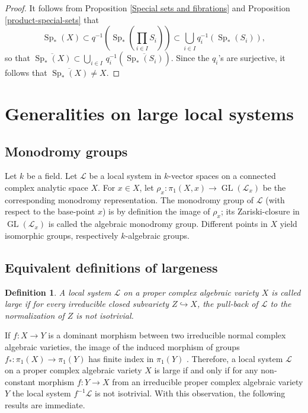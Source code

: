\documentclass[11pt,letterpaper]{amsart}
\def\cL{\mathcal{L}}
\theoremstyle{plain}
\newtheorem{defn}[thm]{Definition}
\DeclareMathOperator{\Sp}{Sp}
\DeclareMathOperator{\GL}{GL}
\begin{document}
\begin{proof}
It follows from Proposition \ref{Special sets and fibrations} and Proposition \ref{product-special-sets} that
\[ \Sp_\ast(X) \subset  q^{-1} \left( \Sp_*(\prod_{i \in I} S_i) \right) \subset \bigcup_{i \in I} q_i^{-1} \left(\Sp_*(S_i) \right),\]
so that $\overline{\Sp_\ast(X)} \subset \bigcup_{i \in I} \, q_i^{-1} (\overline{\Sp_\ast(S_i)} )$.
Since the $q_i$'s are surjective, it follows that $\overline{\Sp_\ast(X)} \neq X$.
\end{proof}



\section{Generalities on large local systems}\label{large local systems}

\subsection{Monodromy groups}

Let $k$ be a field. Let $\cL$ be a local system in $k$-vector spaces on a connected complex analytic space $X$. For $x \in X$, let $\rho_x \colon \pi_1(X, x) \to \GL(\cL_x)$ be the corresponding monodromy representation. The monodromy group of $\cL$ (with respect to the base-point $x$) is by definition the image of $\rho_x$; its Zariski-closure in $\GL(\cL_x)$ is called the algebraic monodromy group. Different points in $X$ yield isomorphic groups, respectively $k$-algebraic groups.


\subsection{Equivalent definitions of largeness}


\begin{defn}
A local system $\cL$ on a proper complex algebraic variety $X$ is called large if for every irreducible closed subvariety $Z \hookrightarrow X$, the pull-back of $\cL$ to the normalization of $Z$ is not isotrivial.
\end{defn}

If $f \colon X \to Y$ is a dominant morphism between two irreducible normal complex algebraic varieties, the image of the induced morphism of groups $f_\ast \colon \pi_1(X) \to \pi_1(Y)$ has finite index in $\pi_1(Y)$ \cite{Campana91}. Therefore, a local system $\cL$ on a proper complex algebraic variety $X$ is large if and only if for any non-constant morphism $f \colon Y \to X$ from an irreducible proper complex algebraic variety $Y$ the local system $f^{-1} \cL$ is not isotrivial. With this observation, the following results are immediate.
\end{document}
